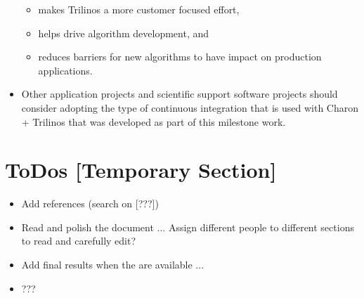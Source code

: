 \documentclass[pdf,ps2pdf,11pt]{SANDreport}
\begin{document}
\begin{itemize}
\begin{itemize}
  {}\item makes Trilinos a more customer focused effort,

  {}\item helps drive algorithm development, and
        
  {}\item reduces barriers for new algorithms to have impact on production
  applications.

  \end{itemize}

{}\item Other application projects and scientific support software projects
should consider adopting the type of continuous integration that is used with
Charon + Trilinos that was developed as part of this milestone work.

\end{itemize}


\section{ToDos [Temporary Section]}

\begin{itemize}

{}\item Add references (search on [???])

{}\item Read and polish the document ... Assign different people to different
sections to read and carefully edit?

{}\item Add final results when the are available ...

{}\item ???

\end{itemize}

%
\clearpage



%
%

\end{document}
